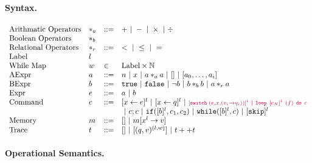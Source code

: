 \documentclass[a4paper,11pt]{article}
\begin{document}
\paragraph{Syntax.}
\[
\begin{array}{llll}
 \mbox{Arithmatic Operators} & *_a & ::= & + ~|~ - ~|~ \times 
%
~|~ \div \\  
  \mbox{Boolean Operators} & *_b & & \\
   \mbox{Relational Operators} & *_r & ::= & < ~|~ \leq ~|~ = \\  
 \mbox{Label} & l & & \\ 
 \mbox{While Map} & w & \in & \mbox{Label} \times \mathbb{N} \\
\mbox{AExpr} & \aexpr & ::= & 
	n ~|~ x ~|~ \aexpr *_a \aexpr ~|~ [] ~|~ [\aexpr_0, \dots, \aexpr_i] \\
\mbox{BExpr} & \bexpr & ::= & 
	\etrue ~|~ \efalse  ~|~ \neg \bexpr
	 ~|~ \bexpr *_b \bexpr
	~|~ \aexpr *_r \aexpr \\
\mbox{Expr} & \expr & ::= & \aexpr \sep \bexpr \\	
\mbox{Command} & c & ::= &   [\assign x \expr]^{l} ~|~  [\assign x q]^{l}
%
~|~ \jl{[\eswitch( \expr, x, (v_i \to  q_i))]^{l} \sep \eloop ~ [\expr_N]^{l} ~ (f) ~ \edo ~ c }  \\ 
& & & ~|~  c ; c ~|~ \eif([\bexpr]^{l}, c_1, c_2) 
	~|~ \ewhile([\bexpr]^{l}, c) ~|~ [\eskip]^{l} 
	\\
\mbox{Memory} & m & ::= & [] ~|~ m[x^{l} \to v] \\
%
\mbox{Trace} & t & ::= & [] ~|~ [(q, v)^{(l, w) }] ~|~ t ++ t
\end{array}
\]
%
\paragraph{Operational Semantics.}
\end{document}
